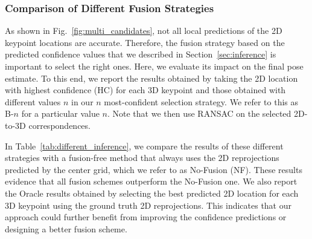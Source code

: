 \documentclass[10pt,twocolumn,letterpaper]{article}
\begin{document}
\subsubsection{Comparison of Different Fusion Strategies}
\label{sec:differentInference}

As shown in Fig.~\ref{fig:multi_candidates}, not all local predictions of the 2D keypoint locations are accurate. Therefore, the fusion strategy based on the predicted confidence values that we described in Section~\ref{sec:inference} is important to select the right ones. Here, we evaluate its impact on the final pose estimate. To this end, we report the results obtained by taking the 2D location with highest confidence (HC) for each 3D keypoint and those obtained with different values $n$ in our $n$ most-confident selection strategy. We refer to this as B-$n$ for a particular value $n$. Note that we then use RANSAC on the selected 2D-to-3D correspondences.

In Table~\ref{tab:different_inference}, we compare the results of these different strategies with a fusion-free method that always uses the 2D reprojections predicted by the center grid, which we refer to as No-Fusion (NF). These results evidence that all fusion schemes outperform the No-Fusion one. We also report the Oracle results obtained by selecting the best predicted 2D location for each 3D keypoint using the ground truth 2D reprojections. This indicates that our approach could further benefit from improving the confidence predictions or designing a better fusion scheme. 
\end{document}

